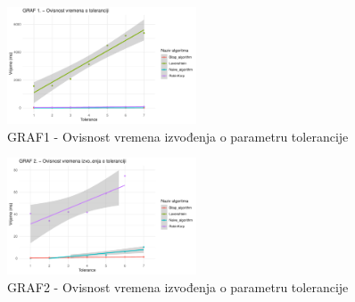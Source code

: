 \documentclass[conference]{IEEEtran}
\begin{document}
\begin{figure}[htbp]
\centerline{\includegraphics[width=0.5\textwidth]{Grafovi_i_csv_datoteke/GRAF1.png}}
\caption{GRAF1 - Ovisnost vremena izvođenja o parametru tolerancije}
\label{fig}
\end{figure}



\begin{figure}[htbp]
\centerline{\includegraphics[width=0.5\textwidth]{Grafovi_i_csv_datoteke/GRAF2.png}}
\caption{GRAF2 - Ovisnost vremena izvođenja o parametru tolerancije}
\label{fig}
\end{figure}
\end{document}
